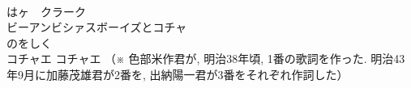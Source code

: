 \documentclass[10pt,b5j]{tarticle} %
\begin{document}
\begin{enumerate}
\begin{minipage}[c]{\blocksize}
    \end{minipage}
    \begin{minipage}[c]{\blocksize}
        
        \vspace{\linespace}
        \item~\\
        はヶ　クラーク\\
        ビーアンビシァスボーイズとコチャ\\
        のをしく\\
        コチャエ コチャエ
        （※
        色部米作君が, 明治38年頃, 
        1番の歌詞を作った. 
        明治43年9月に加藤茂雄君が2番を, 
        出納陽一君が3番をそれぞれ作詞した）
    
    \end{minipage}
\end{enumerate} %
\end{document}
